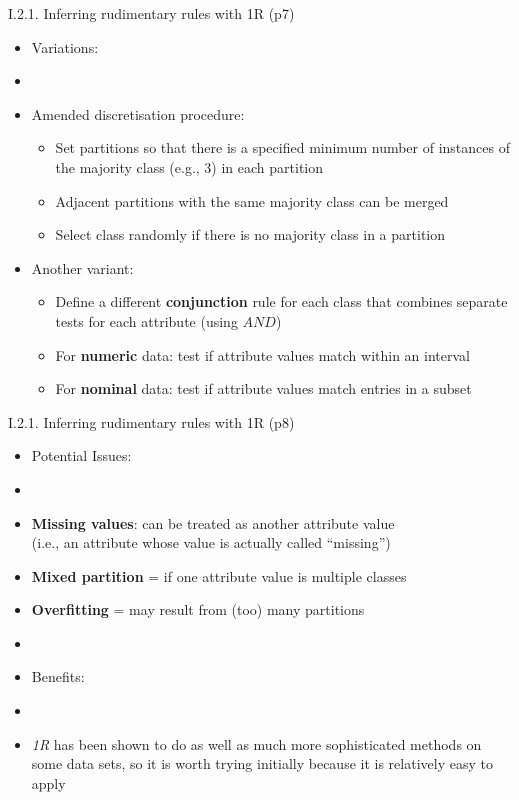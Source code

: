 \documentclass[handout]{beamer}
\newcommand{\strong}[1]{\textbf{\color{teal} #1}}
\begin{document}
\begin{frame}{I.2.1. Inferring rudimentary rules with 1R (p7)}
\begin{itemize}
\item[] Variations:
\item[]
\item Amended discretisation procedure:
	\begin{itemize}
	\item Set partitions so that there is a specified minimum number of instances of the majority class (e.g., $3$) in each partition
	\item Adjacent partitions with the same majority class can be merged
	\item Select class randomly if there is no majority class in a partition
	\end{itemize}
\item Another variant:
	\begin{itemize}
	\item Define a different \strong{conjunction} rule for each class that combines separate tests for each attribute (using $AND$)
	\item For \strong{numeric} data: test if attribute values match within an interval
	\item For \strong{nominal} data: test if attribute values match entries in a subset
	\end{itemize}
\end{itemize}
\end{frame}
\begin{frame}{I.2.1. Inferring rudimentary rules with 1R (p8)}
\begin{itemize}
\item[] Potential Issues:
\item[]
\item \strong{Missing values}: can be treated as another attribute value\\
		(i.e., an attribute whose value is actually called ``missing'')
\item \strong{Mixed partition} = if one attribute value is multiple classes
\item \strong{Overfitting} = may result from (too) many partitions
\item[]
\item[] Benefits:
\item[]
\item \emph{1R} has been shown to do as well as much more sophisticated methods on some data sets, so it is worth trying initially because it is relatively easy to apply
\end{itemize}
\end{frame}
\end{document}
